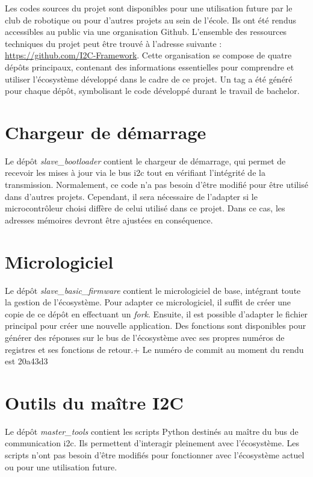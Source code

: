Les codes sources du projet sont disponibles pour une utilisation future par le club de robotique ou pour d'autres projets au sein de l'école.
Ils ont été rendus accessibles au public via une organisation Github.
L'ensemble des ressources techniques du projet peut être trouvé à l'adresse suivante : \url{https://github.com/I2C-Framework}.
Cette organisation se compose de quatre dépôts principaux, contenant des informations essentielles pour comprendre et utiliser l'écosystème développé dans le cadre de ce projet.
Un tag a été généré pour chaque dépôt, symbolisant le code développé durant le travail de bachelor.

\section{Chargeur de démarrage}

Le dépôt \textit{slave\_bootloader} contient le chargeur de démarrage, qui permet de recevoir les mises à jour via le bus \gls{i2c} tout en vérifiant l'intégrité de la transmission.
Normalement, ce code n'a pas besoin d'être modifié pour être utilisé dans d'autres projets.
Cependant, il sera nécessaire de l'adapter si le microcontrôleur choisi diffère de celui utilisé dans ce projet.
Dans ce cas, les adresses mémoires devront être ajustées en conséquence.

\section{Micrologiciel}

Le dépôt \textit{slave\_basic\_firmware} contient le micrologiciel de base, intégrant toute la gestion de l'écosystème.
Pour adapter ce micrologiciel, il suffit de créer une copie de ce dépôt en effectuant un \textit{fork}.
Ensuite, il est possible d'adapter le fichier principal pour créer une nouvelle application.
Des fonctions sont disponibles pour générer des réponses sur le bus de l'écosystème avec ses propres numéros de registres et ses fonctions de retour.+
Le numéro de commit au moment du rendu est 20a43d3

\section{Outils du maître I2C}

Le dépôt \textit{master\_tools} contient les scripts Python destinés au maître du bus de communication \gls{i2c}.
Ils permettent d'interagir pleinement avec l'écosystème.
Les scripts n'ont pas besoin d'être modifiés pour fonctionner avec l'écosystème actuel ou pour une utilisation future.